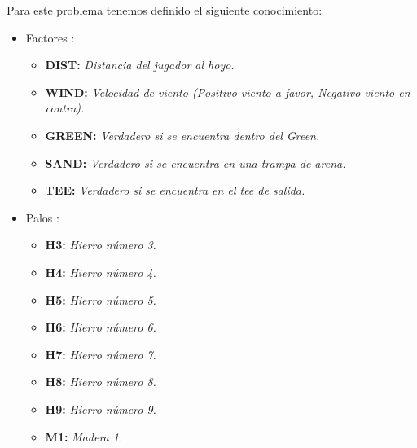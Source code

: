 \documentclass[runningheads,a4paper]{llncs}
\begin{document}
Para este problema tenemos definido el siguiente conocimiento:\\
\begin{itemize}

	\item Factores :
	\\

	\begin{itemize}

    \item \textbf{DIST:} \textit{Distancia del jugador al hoyo.}

    \item \textbf{WIND:} \textit{Velocidad de viento (Positivo viento a favor,
      Negativo viento en contra).}

    \item \textbf{GREEN:} \textit{Verdadero si se encuentra dentro del Green.}

    \item \textbf{SAND:} \textit{Verdadero si se encuentra en una trampa de
      arena.}

    \item \textbf{TEE:} \textit{Verdadero si se encuentra en el tee de
      salida.}\\

	\end{itemize}
	
  \item Palos :
	\\

	\begin{itemize}

    \item \textbf{H3:} \textit{Hierro número 3.}

    \item \textbf{H4:} \textit{Hierro número 4.}

    \item \textbf{H5:} \textit{Hierro número 5.}

    \item \textbf{H6:} \textit{Hierro número 6.}

    \item \textbf{H7:} \textit{Hierro número 7.}

    \item \textbf{H8:} \textit{Hierro número 8.}

    \item \textbf{H9:} \textit{Hierro número 9.}

    \item \textbf{M1:} \textit{Madera 1.}


\end{itemize}
\end{itemize}
\end{document}
